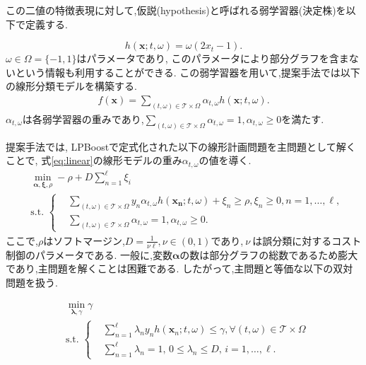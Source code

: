 \documentclass{zasshi-prml3}
\theoremstyle{definition}
\begin{document}
この二値の特徴表現に対して,仮説(hypothesis)と呼ばれる弱学習器(決定株)を以下で定義する.

\begin{equation*}
	h(\bm{x};t,\omega) = \omega (2x_t - 1).
\end{equation*}
$\omega \in \Omega = \{-1,1\}$はパラメータであり,
このパラメータにより部分グラフを含まないという情報も利用することができる.
この弱学習器を用いて,提案手法では以下の線形分類モデルを構築する.
\begin{align}
	\label{eq:linear}
	f(\bm{x}) = \sum_{(t,\omega) \in \mathcal{T}\times \Omega} \alpha_{t,\omega} h(\bm{x};t,\omega).
\end{align}
$\alpha_{t,\omega}$は各弱学習器の重みであり,$\sum_{(t,\omega) \in \mathcal{T}\times \Omega} \alpha_{t,\omega}=1,\alpha_{t,\omega} \geq 0$を満たす.

提案手法では,
LPBoostで定式化された以下の線形計画問題を主問題として解くことで,
式\eqref{eq:linear}の線形モデルの重み$\alpha_{t,\omega}$の値を導く.
\begin{align}
	&\min_{\bm{\alpha},\bm{\xi},\rho} -\rho + D \sum_{n=1}^{\ell} \xi_{i} \nonumber\\
				&\text{s.t.} \,\,\left\{
	\begin{aligned}
		&\sum_{(t,\omega) \in \mathcal{T} \times \Omega} y_{n} \alpha_{t,\omega} h(\bm{x_{n}};t,\omega) + \xi_{n} \geq \rho,
		\xi_{n} \geq 0,	n = 1, \dots , \ell,\nonumber \\
		&\sum_{(t,\omega) \in \mathcal{T} \times \Omega} \alpha_{t, \omega} = 1, \alpha_{t, \omega} \geq 0.
	\end{aligned}\right.
\end{align}
ここで,$\rho$はソフトマージン,$D=\frac{1}{\nu \ell}, \nu \in (0,1)$であり,$\ \nu\ $は誤分類に対するコスト制御のパラメータである.
一般に,変数$\bm{\alpha}$の数は部分グラフの総数であるため膨大であり,主問題を解くことは困難である.
したがって,主問題と等価な以下の双対問題を扱う.

\begin{align}
	\label{eq:dualprob}
	&\min_{\bm{\lambda},\gamma} \gamma \nonumber\\
	&\text{s.t.} \,\,\left\{
	\begin{aligned}
	& \sum_{n=1}^{\ell} \lambda_{n} y_{n} h(\bm{x}_{n};t,\omega) \leq \gamma,
	\forall(t,\omega) \in \mathcal{T} \times \Omega\\
	& \sum_{n=1}^{\ell} \lambda_{n} = 1, \,0 \leq \lambda_{n} \leq D, \,i = 1, \dots , \ell. 
\end{aligned}\right. \end{align}
\end{document}
